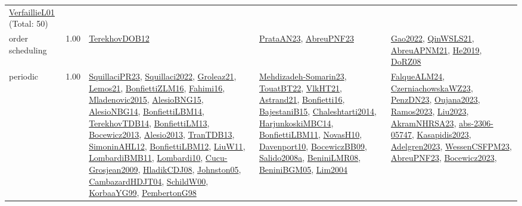 {\begin{longtable}{p{3cm}r>{\raggedright\arraybackslash}p{6cm}>{\raggedright\arraybackslash}p{6cm}>{\raggedright\arraybackslash}p{8cm}}
\hyperref[detail:VerfaillieL01]{VerfaillieL01} (Total: 50)\\
\index{order scheduling}\index{Concepts!order scheduling}order scheduling &  1.00 & \hyperref[detail:TerekhovDOB12]{TerekhovDOB12} & \hyperref[detail:PrataAN23]{PrataAN23}, \hyperref[detail:AbreuPNF23]{AbreuPNF23} & \hyperref[detail:Gao2022]{Gao2022}, \hyperref[detail:QinWSLS21]{QinWSLS21}, \hyperref[detail:AbreuAPNM21]{AbreuAPNM21}, \hyperref[detail:He2019]{He2019}, \hyperref[detail:DoRZ08]{DoRZ08}\\
\index{periodic}\index{Concepts!periodic}periodic &  1.00 & \hyperref[detail:SquillaciPR23]{SquillaciPR23}, \hyperref[detail:Squillaci2022]{Squillaci2022}, \hyperref[detail:Groleaz21]{Groleaz21}, \hyperref[detail:Lemos21]{Lemos21}, \hyperref[detail:BonfiettiZLM16]{BonfiettiZLM16}, \hyperref[detail:Fahimi16]{Fahimi16}, \hyperref[detail:Mladenovic2015]{Mladenovic2015}, \hyperref[detail:AlesioBNG15]{AlesioBNG15}, \hyperref[detail:AlesioNBG14]{AlesioNBG14}, \hyperref[detail:BonfiettiLBM14]{BonfiettiLBM14}, \hyperref[detail:TerekhovTDB14]{TerekhovTDB14}, \hyperref[detail:BonfiettiLM13]{BonfiettiLM13}, \hyperref[detail:Bocewicz2013]{Bocewicz2013}, \hyperref[detail:Alesio2013]{Alesio2013}, \hyperref[detail:TranTDB13]{TranTDB13}, \hyperref[detail:SimoninAHL12]{SimoninAHL12}, \hyperref[detail:BonfiettiLBM12]{BonfiettiLBM12}, \hyperref[detail:LiuW11]{LiuW11}, \hyperref[detail:LombardiBMB11]{LombardiBMB11}, \hyperref[detail:Lombardi10]{Lombardi10}, \hyperref[detail:Cucu-Grosjean2009]{Cucu-Grosjean2009}, \hyperref[detail:HladikCDJ08]{HladikCDJ08}, \hyperref[detail:Johnston05]{Johnston05}, \hyperref[detail:CambazardHDJT04]{CambazardHDJT04}, \hyperref[detail:SchildW00]{SchildW00}, \hyperref[detail:KorbaaYG99]{KorbaaYG99}, \hyperref[detail:PembertonG98]{PembertonG98} & \hyperref[detail:Mehdizadeh-Somarin23]{Mehdizadeh-Somarin23}, \hyperref[detail:TouatBT22]{TouatBT22}, \hyperref[detail:VlkHT21]{VlkHT21}, \hyperref[detail:Astrand21]{Astrand21}, \hyperref[detail:Bonfietti16]{Bonfietti16}, \hyperref[detail:BajestaniB15]{BajestaniB15}, \hyperref[detail:Chaleshtarti2014]{Chaleshtarti2014}, \hyperref[detail:HarjunkoskiMBC14]{HarjunkoskiMBC14}, \hyperref[detail:BonfiettiLBM11]{BonfiettiLBM11}, \hyperref[detail:NovasH10]{NovasH10}, \hyperref[detail:Davenport10]{Davenport10}, \hyperref[detail:BocewiczBB09]{BocewiczBB09}, \hyperref[detail:Salido2008a]{Salido2008a}, \hyperref[detail:BeniniLMR08]{BeniniLMR08}, \hyperref[detail:BeniniBGM05]{BeniniBGM05}, \hyperref[detail:Lim2004]{Lim2004} & \hyperref[detail:FalqueALM24]{FalqueALM24}, \hyperref[detail:CzerniachowskaWZ23]{CzerniachowskaWZ23}, \hyperref[detail:PenzDN23]{PenzDN23}, \hyperref[detail:Oujana2023]{Oujana2023}, \hyperref[detail:Ramos2023]{Ramos2023}, \hyperref[detail:Liu2023]{Liu2023}, \hyperref[detail:AkramNHRSA23]{AkramNHRSA23}, \hyperref[detail:abs-2306-05747]{abs-2306-05747}, \hyperref[detail:Kasapidis2023]{Kasapidis2023}, \hyperref[detail:Adelgren2023]{Adelgren2023}, \hyperref[detail:WessenCSFPM23]{WessenCSFPM23}, \hyperref[detail:AbreuPNF23]{AbreuPNF23}, \hyperref[detail:Bocewicz2023]{Bocewicz2023}, 
\end{longtable}}
